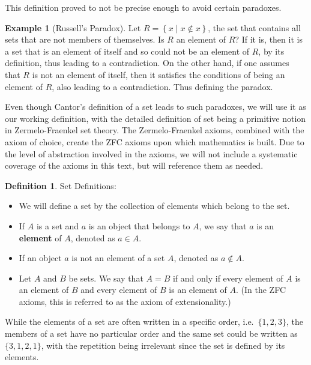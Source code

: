 \documentclass[
]{book}
\theoremstyle{definition}
\newtheorem{definition}{Definition}[chapter]
\theoremstyle{definition}
\newtheorem{example}{Example}[chapter]
\theoremstyle{definition}
\theoremstyle{definition}
\theoremstyle{remark}
\begin{document}
This definition proved to not be precise enough to avoid certain paradoxes.

\begin{example}[Russell's Paradox]
Let \(R= \left\{ x \middle \vert x\notin x\right\}\), the set that contains all sets that are not members of themselves. Is \(R\) an element of \(R\)? If it is, then it is a set that is an element of itself and so could not be an element of \(R\), by its definition, thus leading to a contradiction. On the other hand, if one assumes that \(R\) is not an element of itself, then it satisfies the conditions of being an element of \(R\), also leading to a contradiction. Thus defining the paradox.
\end{example}

Even though Cantor's definition of a set leads to such paradoxes, we will use it as our working definition, with the detailed definition of set being a primitive notion in Zermelo-Fraenkel set theory. The Zermelo-Fraenkel axioms, combined with the axiom of choice, create the ZFC axioms upon which mathematics is built. Due to the level of abstraction involved in the axioms, we will not include a systematic coverage of the axioms in this text, but will reference them as needed.

\begin{definition}

Set Definitions:

\begin{itemize}
\item
  We will define a set by the collection of elements which belong to the set.
\item
  If \(A\) is a set and \(a\) is an object that belongs to \(A\), we say that \(a\) is an \textbf{element} of \(A\), denoted as \(a\in A\).
\item
  If an object \(a\) is not an element of a set \(A\), denoted as \(a \notin A\).
\item
  Let \(A\) and \(B\) be sets. We say that \(A=B\) if and only if every element of \(A\) is an element of \(B\) and every element of \(B\) is an element of \(A\). (In the ZFC axioms, this is referred to as the axiom of extensionality.)
\end{itemize}

\end{definition}

While the elements of a set are often written in a specific order, i.e.~\(\{1,2,3\}\), the members of a set have no particular order and the same set could be written as \(\{3, 1, 2, 1\}\), with the repetition being irrelevant since the set is defined by its elements.
\end{document}
